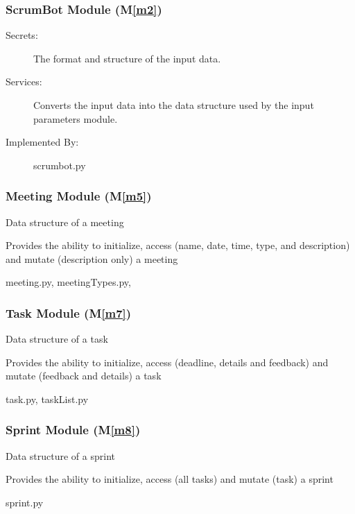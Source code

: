 \documentclass[12pt, titlepage]{article}
\newcommand{\mref}[1]{M\ref{#1}}
\begin{document}
\subsubsection{ScrumBot Module (\mref{m2})}
\begin{description}
    \item[Secrets:] The format and structure of the input data.
    \item[Services:] Converts the input data into the data structure used by the input parameters module.
    \item[Implemented By:] scrumbot.py
\end{description}

\subsubsection{Meeting Module (\mref{m5})}
\begin{description}
\color{red}
    \item[Secrets:] Data structure of a meeting
    \item[Services:] Provides the ability to initialize, access (name, date, time, type, and description) and mutate (description only) a meeting
    \item[Implemented By:] meeting.py, meetingTypes.py,
\end{description}

\subsubsection{Task Module (\mref{m7})}
\begin{description}
\color{red}
    \item[Secrets:] Data structure of a task
    \item[Services:] Provides the ability to initialize, access (deadline, details and feedback) and mutate (feedback and details) a task
    \item[Implemented By:] task.py, taskList.py
\end{description}

\subsubsection{Sprint Module (\mref{m8})}
\begin{description}
\color{red}
    \item[Secrets:] Data structure of a sprint
    \item[Services:] Provides the ability to initialize, access (all tasks) and mutate (task) a sprint
    \item[Implemented By:] sprint.py
\end{description}
\end{document}
